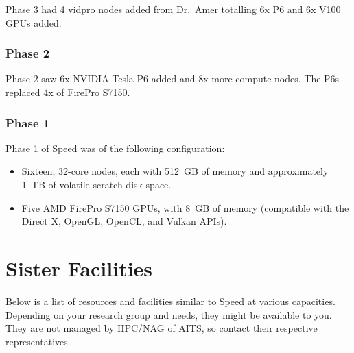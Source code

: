 \documentclass{easychair}
\begin{document}
Phase 3 had 4 vidpro nodes added from Dr.~Amer totalling 6x P6 and 6x V100
GPUs added.

\subsubsection{Phase 2}

Phase 2 saw 6x NVIDIA Tesla P6 added and 8x more compute nodes.
The P6s replaced 4x of FirePro S7150.

\subsubsection{Phase 1}

Phase 1 of Speed was of the following configuration:

\begin{itemize}
\item
Sixteen, 32-core nodes, each with 512~GB of memory and approximately 1~TB of volatile-scratch disk space. 
\item
Five AMD FirePro S7150 GPUs, with 8~GB of memory (compatible with the Direct X, OpenGL, OpenCL, and Vulkan APIs). 
\end{itemize}



\section{Sister Facilities}

Below is a list of resources and facilities similar to Speed at various capacities.
Depending on your research group and needs, they might be available to you. They
are not managed by HPC/NAG of AITS, so contact their respective representatives.
\end{document}

